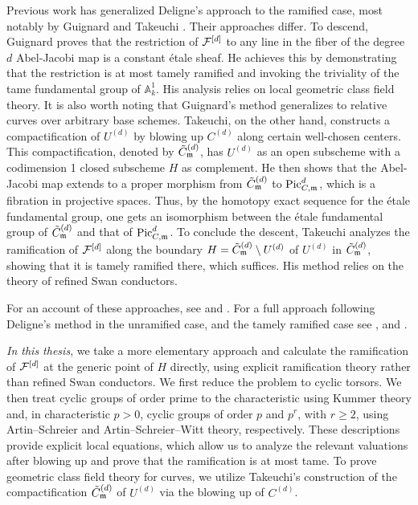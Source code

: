 Previous work has generalized Deligne's approach to the ramified case, 
most notably by Guignard \cite{Guignard2018} and Takeuchi \cite{takeuchi2018blow}.
Their approaches differ. 
To descend, Guignard proves that the restriction of $\cF^{[d]}$ to any line in the fiber of the degree $d$ Abel-Jacobi map is a constant 
étale sheaf. He achieves this by demonstrating that the restriction is at most tamely ramified and invoking the triviality of the tame fundamental group 
of $\mathbb{A}^1_k$. His analysis relies on local geometric class field theory. 
It is also worth noting that Guignard's method generalizes to relative curves over arbitrary base schemes.
Takeuchi, on the other hand, constructs a compactification of $U^{(d)}$ by blowing up $C^{(d)}$ along certain well-chosen centers.
This compactification, denoted by $\tilde{C}^{(d)}_\mdls$, has $U^{(d)}$ as an open subscheme with a codimension 1 closed subscheme $H$ as complement. 
He then shows that the Abel-Jacobi map extends to a proper morphism from $\tilde{C}^{(d)}_\mdls$ to $\PicCm[d]$,
which is a fibration in projective spaces. Thus, by the homotopy exact sequence for the \'etale fundamental group, one gets an isomorphism between the \'etale fundamental group of
$\tilde{C}^{(d)}_\mdls$ and that of $\PicCm[d]$. To conclude the descent, Takeuchi analyzes the ramification of $\cF^{[d]}$ along the boundary
$H=\tilde{C}^{(d)}_\mdls \setminus U^{(d)}$ of $U^{(d)}$ in $\tilde{C}^{(d)}_\mdls$,
showing that it is tamely ramified there, which suffices. His method relies on the theory of refined Swan conductors.

For an account of these approaches, see \cite{Guignard2018} and \cite{takeuchi2018blow}.
For a full approach following Deligne's method in the unramified case, and the tamely ramified case see \cite{tendler2015geometricclassfieldtheory}, and \cite{Toth2011}.

\textit{In this thesis}, we take a more elementary approach and calculate the ramification of $\cF^{[d]}$ at the generic point of $H$ directly, using explicit ramification theory rather than refined Swan conductors.
We first reduce the problem to cyclic torsors. We then treat cyclic groups of order prime to the characteristic using Kummer theory and, in characteristic $p>0$, cyclic groups of order $p$ and $p^r$, with $r\geq2$, using Artin--Schreier and Artin--Schreier--Witt theory, respectively.
These descriptions provide explicit local equations, which allow us to analyze the relevant valuations after blowing up and prove that the ramification is at most tame.
To prove geometric class field theory for curves, 
we utilize Takeuchi's construction of the compactification $\tilde{C}^{(d)}_\mdls$ 
of $U^{(d)}$ via the blowing up of $C^{(d)}$.

